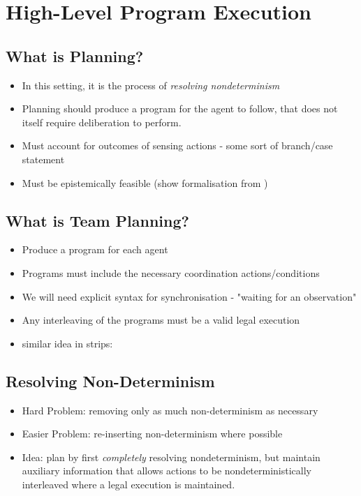 \chapter{High-Level Program Execution}\label{ch:execution}

\section{What is Planning?}
\begin{itemize}
\item In this setting, it is the process of \emph{resolving nondeterminism}
\item Planning should produce a program for the agent to follow, that does
not itself require deliberation to perform. \cite{levesque96what_is_planning,giacomo04sem_delib_indigolog}
\item Must account for outcomes of sensing actions - some sort of branch/case statement
\item Must be epistemically feasible (show formalisation from \cite{giacomo04sem_delib_indigolog})
\end{itemize}

\section{What is Team Planning?}
\begin{itemize}
\item Produce a program for each agent
\item Programs must include the necessary coordination actions/conditions
\item We will need explicit syntax for synchronisation - "waiting for an observation"
\item Any interleaving of the programs must be a valid legal execution
\item similar idea in strips: \cite{boutilier01partialorder_conc}
\end{itemize}

\section{Resolving Non-Determinism}
\begin{itemize}
\item Hard Problem: removing only as much non-determinism as necessary
\item Easier Problem: re-inserting non-determinism where possible
\item Idea:  plan by first \emph{completely} resolving nondeterminism, but
maintain auxiliary information that allows actions to be nondeterministically 
interleaved where a legal execution is maintained.
\end{itemize}

